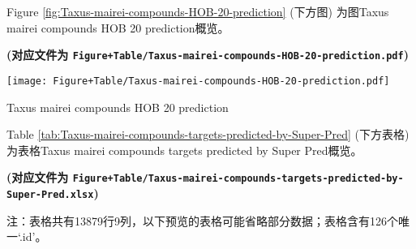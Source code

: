 \documentclass[
]{article}
\begin{document}
Figure \ref{fig:Taxus-mairei-compounds-HOB-20-prediction} (下方图) 为图Taxus mairei compounds HOB 20 prediction概览。

\textbf{(对应文件为 \texttt{Figure+Table/Taxus-mairei-compounds-HOB-20-prediction.pdf})}

\def\@captype{figure}
\begin{center}
\texttt{[image: Figure+Table/Taxus-mairei-compounds-HOB-20-prediction.pdf]}
\caption{Taxus mairei compounds HOB 20 prediction}\label{fig:Taxus-mairei-compounds-HOB-20-prediction}
\end{center}

Table \ref{tab:Taxus-mairei-compounds-targets-predicted-by-Super-Pred} (下方表格) 为表格Taxus mairei compounds targets predicted by Super Pred概览。

\textbf{(对应文件为 \texttt{Figure+Table/Taxus-mairei-compounds-targets-predicted-by-Super-Pred.xlsx})}

\begin{center}\begin{tcolorbox}[colback=gray!10, colframe=gray!50, width=0.9\linewidth, arc=1mm, boxrule=0.5pt]注：表格共有13879行9列，以下预览的表格可能省略部分数据；表格含有126个唯一`.id'。
\end{tcolorbox}
\end{center}
\end{document}
